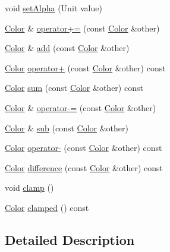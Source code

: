 \begin{DoxyCompactItemize}
void \hyperlink{class_race_tray_1_1_color_ad1959b679e3e7c3bd88e078d98c4e8ae}{set\-Alpha} (Unit value)
\item 
\hyperlink{class_race_tray_1_1_color}{Color} \& \hyperlink{class_race_tray_1_1_color_ac5abb56ea0b51d2df819e873b8539399}{operator+=} (const \hyperlink{class_race_tray_1_1_color}{Color} \&other)
\item 
\hyperlink{class_race_tray_1_1_color}{Color} \& \hyperlink{class_race_tray_1_1_color_abdab4e4920642970217635ba97cdfefc}{add} (const \hyperlink{class_race_tray_1_1_color}{Color} \&other)
\item 
\hyperlink{class_race_tray_1_1_color}{Color} \hyperlink{class_race_tray_1_1_color_aa82e66afb467bab0074be4e82362a9fe}{operator+} (const \hyperlink{class_race_tray_1_1_color}{Color} \&other) const 
\item 
\hyperlink{class_race_tray_1_1_color}{Color} \hyperlink{class_race_tray_1_1_color_a807c15bcd88c175dc296e5755e218201}{sum} (const \hyperlink{class_race_tray_1_1_color}{Color} \&other) const 
\item 
\hyperlink{class_race_tray_1_1_color}{Color} \& \hyperlink{class_race_tray_1_1_color_a625f389f8990d6b9c72fcf4f015f246b}{operator-\/=} (const \hyperlink{class_race_tray_1_1_color}{Color} \&other)
\item 
\hyperlink{class_race_tray_1_1_color}{Color} \& \hyperlink{class_race_tray_1_1_color_aa48224a163f209e4cc14d469dd2bb409}{sub} (const \hyperlink{class_race_tray_1_1_color}{Color} \&other)
\item 
\hyperlink{class_race_tray_1_1_color}{Color} \hyperlink{class_race_tray_1_1_color_ae56d582340b54a63a957c5bc1b11e72a}{operator-\/} (const \hyperlink{class_race_tray_1_1_color}{Color} \&other) const 
\item 
\hyperlink{class_race_tray_1_1_color}{Color} \hyperlink{class_race_tray_1_1_color_a9c37343537eb86200e83086a06a15df6}{difference} (const \hyperlink{class_race_tray_1_1_color}{Color} \&other) const 
\item 
void \hyperlink{class_race_tray_1_1_color_ae106d58f45c7d70d96eeb190262f78b6}{clamp} ()
\item 
\hyperlink{class_race_tray_1_1_color}{Color} \hyperlink{class_race_tray_1_1_color_ab789ee21b42357d9c29a858b8a310948}{clamped} () const 
\end{DoxyCompactItemize}


\subsection{Detailed Description}
